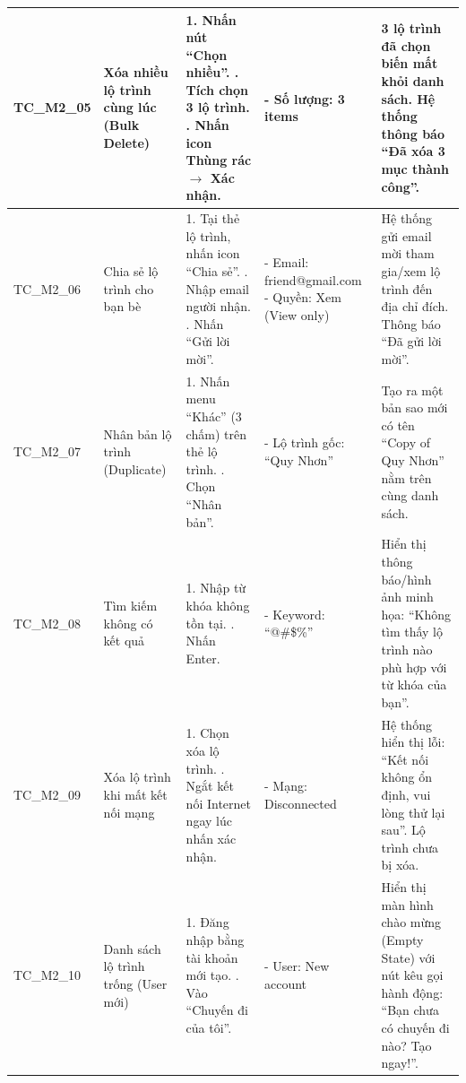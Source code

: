 \begin{landscape}
\begin{longtable}{|p{2.5cm}|p{4.0cm}|p{6.5cm}|p{4.5cm}|p{4.5cm}|}
TC\_M2\_05 & Xóa nhiều lộ trình cùng lúc (Bulk Delete) & 
1. Nhấn nút ``Chọn nhiều''. \newline 
2. Tích chọn 3 lộ trình. \newline 
3. Nhấn icon Thùng rác $\to$ Xác nhận. & 
- Số lượng: 3 items & 
3 lộ trình đã chọn biến mất khỏi danh sách. Hệ thống thông báo ``Đã xóa 3 mục thành công''. \\
\hline

TC\_M2\_06 & Chia sẻ lộ trình cho bạn bè & 
1. Tại thẻ lộ trình, nhấn icon ``Chia sẻ''. \newline 
2. Nhập email người nhận. \newline 
3. Nhấn ``Gửi lời mời''. & 
- Email: friend@gmail.com \newline
- Quyền: Xem (View only) & 
Hệ thống gửi email mời tham gia/xem lộ trình đến địa chỉ đích. Thông báo ``Đã gửi lời mời''. \\
\hline

TC\_M2\_07 & Nhân bản lộ trình (Duplicate) & 
1. Nhấn menu ``Khác'' (3 chấm) trên thẻ lộ trình. \newline 
2. Chọn ``Nhân bản''. & 
- Lộ trình gốc: ``Quy Nhơn'' & 
Tạo ra một bản sao mới có tên ``Copy of Quy Nhơn'' nằm trên cùng danh sách. \\
\hline

TC\_M2\_08 & Tìm kiếm không có kết quả & 
1. Nhập từ khóa không tồn tại. \newline 
2. Nhấn Enter. & 
- Keyword: ``@\#\$\%'' & 
Hiển thị thông báo/hình ảnh minh họa: ``Không tìm thấy lộ trình nào phù hợp với từ khóa của bạn''. \\
\hline

TC\_M2\_09 & Xóa lộ trình khi mất kết nối mạng & 
1. Chọn xóa lộ trình. \newline 
2. Ngắt kết nối Internet ngay lúc nhấn xác nhận. & 
- Mạng: Disconnected & 
Hệ thống hiển thị lỗi: ``Kết nối không ổn định, vui lòng thử lại sau''. Lộ trình chưa bị xóa. \\
\hline

TC\_M2\_10 & Danh sách lộ trình trống (User mới) & 
1. Đăng nhập bằng tài khoản mới tạo. \newline 
2. Vào ``Chuyến đi của tôi''. & 
- User: New account & 
Hiển thị màn hình chào mừng (Empty State) với nút kêu gọi hành động: ``Bạn chưa có chuyến đi nào? Tạo ngay!''. \\
\hline

\end{longtable}

\end{landscape}
